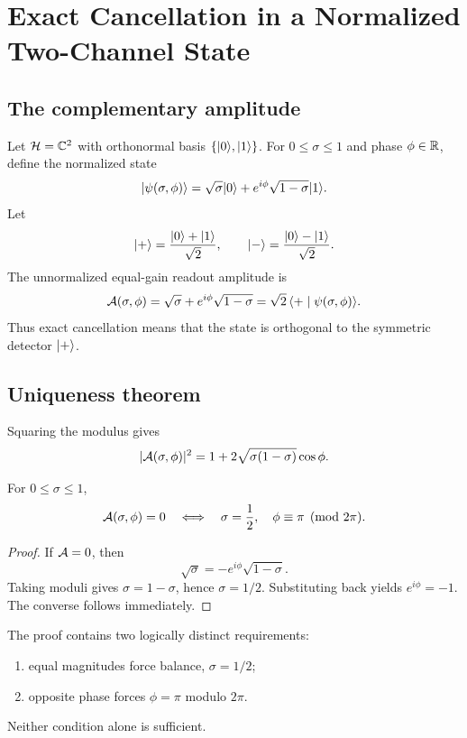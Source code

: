 \chapter{Exact Cancellation in a Normalized Two-Channel State}
\label{chap:cancellation}

\section{The complementary amplitude}

Let $\mathcal{H}=\mathbb{C}^2$ with orthonormal basis $\{\lvert 0\rangle,\lvert 1\rangle\}$. For $0\le\sigma\le1$ and phase $\phi\in\mathbb{R}$, define the normalized state
\begin{equation}
 \lvert \psi(\sigma,\phi)\rangle
 =\sqrt{\sigma}\lvert 0\rangle+e^{i\phi}\sqrt{1-\sigma}\lvert 1\rangle.
 \label{eq:binary-state}
\end{equation}
Let
\[
 \lvert +\rangle=\frac{\lvert 0\rangle+\lvert 1\rangle}{\sqrt2},
 \qquad
 \lvert -\rangle=\frac{\lvert 0\rangle-\lvert 1\rangle}{\sqrt2}.
\]
The unnormalized equal-gain readout amplitude is
\begin{equation}
 \mathcal{A}(\sigma,\phi)
 =\sqrt{\sigma}+e^{i\phi}\sqrt{1-\sigma}
 =\sqrt2\,\langle +\mid \psi(\sigma,\phi)\rangle.
 \label{eq:Acomp-def}
\end{equation}
Thus exact cancellation means that the state is orthogonal to the symmetric detector $\lvert +\rangle$.

\section{Uniqueness theorem}

Squaring the modulus gives
\begin{equation}
 |\mathcal{A}(\sigma,\phi)|^2
 =1+2\sqrt{\sigma(1-\sigma)}\cos\phi.
 \label{eq:Acomp-square}
\end{equation}

\begin{lemma}
\label{lem:exact-cancellation}
For $0\le\sigma\le1$,
\[
 \mathcal{A}(\sigma,\phi)=0
 \quad\Longleftrightarrow\quad
 \sigma=\frac12,
 \quad \phi\equiv\pi\pmod{2\pi}.
\]
\end{lemma}
\begin{proof}
If $\mathcal{A}=0$, then
\[
 \sqrt{\sigma}=-e^{i\phi}\sqrt{1-\sigma}.
\]
Taking moduli gives $\sigma=1-\sigma$, hence $\sigma=1/2$. Substituting back yields $e^{i\phi}=-1$. The converse follows immediately.
\end{proof}

The proof contains two logically distinct requirements:
\begin{enumerate}
  \item equal magnitudes force balance, $\sigma=1/2$;
  \item opposite phase forces $\phi=\pi$ modulo $2\pi$.
\end{enumerate}
Neither condition alone is sufficient.

